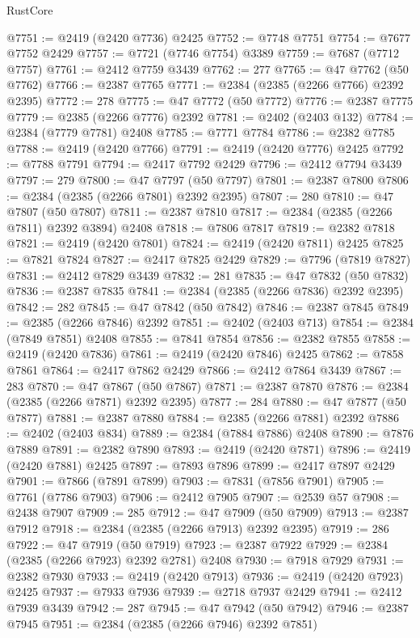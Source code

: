 \begin{lexlean}{RustCore}
\begin{coremodule}
@7751 := @2419 (@2420 @7736) @2425
@7752 := @7748 @7751
@7754 := @7677 @7752 @2429
@7757 := @7721 (@7746 @7754) @3389
@7759 := @7687 (@7712 @7757)
@7761 := @2412 @7759 @3439
@7762 := 277
@7765 := @47 @7762 (@50 @7762)
@7766 := @2387 @7765
@7771 := @2384 (@2385 (@2266 @7766) @2392 @2395)
@7772 := 278
@7775 := @47 @7772 (@50 @7772)
@7776 := @2387 @7775
@7779 := @2385 (@2266 @7776) @2392
@7781 := @2402 (@2403 @132)
@7784 := @2384 (@7779 @7781) @2408
@7785 := @7771 @7784
@7786 := @2382 @7785
@7788 := @2419 (@2420 @7766)
@7791 := @2419 (@2420 @7776) @2425
@7792 := @7788 @7791
@7794 := @2417 @7792 @2429
@7796 := @2412 @7794 @3439
@7797 := 279
@7800 := @47 @7797 (@50 @7797)
@7801 := @2387 @7800
@7806 := @2384 (@2385 (@2266 @7801) @2392 @2395)
@7807 := 280
@7810 := @47 @7807 (@50 @7807)
@7811 := @2387 @7810
@7817 := @2384 (@2385 (@2266 @7811) @2392 @3894) @2408
@7818 := @7806 @7817
@7819 := @2382 @7818
@7821 := @2419 (@2420 @7801)
@7824 := @2419 (@2420 @7811) @2425
@7825 := @7821 @7824
@7827 := @2417 @7825 @2429
@7829 := @7796 (@7819 @7827)
@7831 := @2412 @7829 @3439
@7832 := 281
@7835 := @47 @7832 (@50 @7832)
@7836 := @2387 @7835
@7841 := @2384 (@2385 (@2266 @7836) @2392 @2395)
@7842 := 282
@7845 := @47 @7842 (@50 @7842)
@7846 := @2387 @7845
@7849 := @2385 (@2266 @7846) @2392
@7851 := @2402 (@2403 @713)
@7854 := @2384 (@7849 @7851) @2408
@7855 := @7841 @7854
@7856 := @2382 @7855
@7858 := @2419 (@2420 @7836)
@7861 := @2419 (@2420 @7846) @2425
@7862 := @7858 @7861
@7864 := @2417 @7862 @2429
@7866 := @2412 @7864 @3439
@7867 := 283
@7870 := @47 @7867 (@50 @7867)
@7871 := @2387 @7870
@7876 := @2384 (@2385 (@2266 @7871) @2392 @2395)
@7877 := 284
@7880 := @47 @7877 (@50 @7877)
@7881 := @2387 @7880
@7884 := @2385 (@2266 @7881) @2392
@7886 := @2402 (@2403 @834)
@7889 := @2384 (@7884 @7886) @2408
@7890 := @7876 @7889
@7891 := @2382 @7890
@7893 := @2419 (@2420 @7871)
@7896 := @2419 (@2420 @7881) @2425
@7897 := @7893 @7896
@7899 := @2417 @7897 @2429
@7901 := @7866 (@7891 @7899)
@7903 := @7831 (@7856 @7901)
@7905 := @7761 (@7786 @7903)
@7906 := @2412 @7905
@7907 := @2539 @57
@7908 := @2438 @7907
@7909 := 285
@7912 := @47 @7909 (@50 @7909)
@7913 := @2387 @7912
@7918 := @2384 (@2385 (@2266 @7913) @2392 @2395)
@7919 := 286
@7922 := @47 @7919 (@50 @7919)
@7923 := @2387 @7922
@7929 := @2384 (@2385 (@2266 @7923) @2392 @2781) @2408
@7930 := @7918 @7929
@7931 := @2382 @7930
@7933 := @2419 (@2420 @7913)
@7936 := @2419 (@2420 @7923) @2425
@7937 := @7933 @7936
@7939 := @2718 @7937 @2429
@7941 := @2412 @7939 @3439
@7942 := 287
@7945 := @47 @7942 (@50 @7942)
@7946 := @2387 @7945
@7951 := @2384 (@2385 (@2266 @7946) @2392 @7851)

\end{coremodule}
\end{lexlean}
